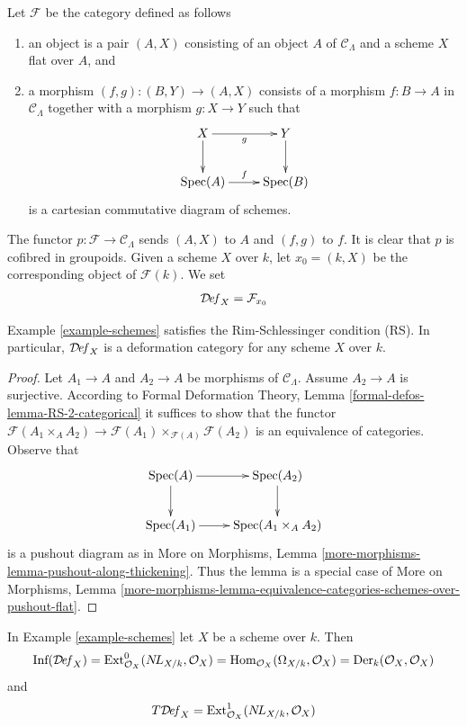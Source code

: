 \begin{example}[Schemes]
\label{example-schemes}
Let $\mathcal{F}$ be the category defined as follows
\begin{enumerate}
\item an object is a pair $(A, X)$ consisting of an
object $A$ of $\mathcal{C}_\Lambda$ and a scheme $X$ flat over $A$, and
\item a morphism $(f, g) : (B, Y) \to (A, X)$ consists of
a morphism $f : B \to A$ in $\mathcal{C}_\Lambda$ together
with a morphism $g : X \to Y$ such that
$$
\xymatrix{
X \ar[r]_g \ar[d] & Y \ar[d] \\
\Spec(A) \ar[r]^f & \Spec(B)
}
$$
is a cartesian commutative diagram of schemes.
\end{enumerate}
The functor $p : \mathcal{F} \to \mathcal{C}_\Lambda$ sends $(A, X)$
to $A$ and $(f, g)$ to $f$. It is clear that $p$ is cofibred in groupoids.
Given a scheme $X$ over $k$, let $x_0 = (k, X)$ be the corresponding object
of $\mathcal{F}(k)$. We set
$$
\mathcal{D}\!\mathit{ef}_X = \mathcal{F}_{x_0}
$$
\end{example}

\begin{lemma}
\label{lemma-schemes-RS}
Example \ref{example-schemes}
satisfies the Rim-Schlessinger condition (RS).
In particular, $\mathcal{D}\!\mathit{ef}_X$ is a deformation category
for any scheme $X$ over $k$.
\end{lemma}

\begin{proof}
Let $A_1 \to A$ and $A_2 \to A$ be morphisms of $\mathcal{C}_\Lambda$.
Assume $A_2 \to A$ is surjective. According to
Formal Deformation Theory, Lemma
\ref{formal-defos-lemma-RS-2-categorical}
it suffices to show that the functor
$\mathcal{F}(A_1 \times_A A_2) \to
\mathcal{F}(A_1) \times_{\mathcal{F}(A)} \mathcal{F}(A_2)$
is an equivalence of categories.
Observe that
$$
\xymatrix{
\Spec(A) \ar[r] \ar[d] & \Spec(A_2) \ar[d] \\
\Spec(A_1) \ar[r] &
\Spec(A_1 \times_A A_2)
}
$$
is a pushout diagram as in More on Morphisms, Lemma
\ref{more-morphisms-lemma-pushout-along-thickening}.
Thus the lemma is a special case of More on Morphisms, Lemma
\ref{more-morphisms-lemma-equivalence-categories-schemes-over-pushout-flat}.
\end{proof}

\begin{lemma}
\label{lemma-schemes-TI}
In Example \ref{example-schemes} let $X$ be a scheme over $k$. Then
$$
\text{Inf}(\mathcal{D}\!\mathit{ef}_X) =
\text{Ext}^0_{\mathcal{O}_X}(\mathop{N\!L}\nolimits_{X/k}, \mathcal{O}_X) =
\mathop{\mathrm{Hom}}\nolimits_{\mathcal{O}_X}(\Omega_{X/k}, \mathcal{O}_X) =
\text{Der}_k(\mathcal{O}_X, \mathcal{O}_X)
$$
and
$$
T\mathcal{D}\!\mathit{ef}_X =
\text{Ext}^1_{\mathcal{O}_X}(\mathop{N\!L}\nolimits_{X/k}, \mathcal{O}_X)
$$
\end{lemma}

